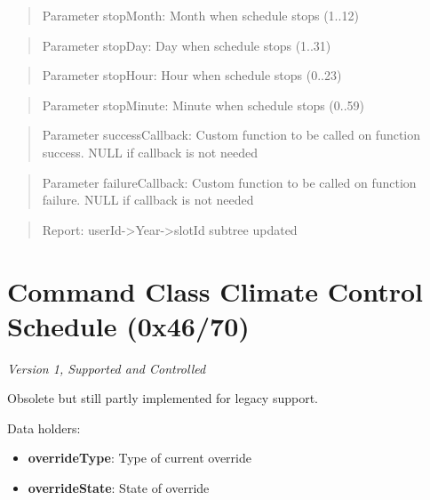 \begin{quote}Parameter stopMonth: Month when schedule stops (1..12)\end{quote}
\begin{quote}Parameter stopDay: Day when schedule stops (1..31)\end{quote}
\begin{quote}Parameter stopHour: Hour when schedule stops (0..23)\end{quote}
\begin{quote}Parameter stopMinute: Minute when schedule stops (0..59)\end{quote}
\begin{quote}Parameter successCallback: Custom function to be called on function success. NULL if callback is not needed\end{quote}
\begin{quote}Parameter failureCallback: Custom function to be called on function failure. NULL if callback is not needed\end{quote}
\begin{quote}Report: userId->Year->slotId subtree updated\end{quote}


\section{Command Class Climate Control Schedule (0x46/70)}

\textit{Version 1, Supported and Controlled}
\newline

Obsolete but still partly implemented for legacy support.
\newline

\noindent
Data holders:

\begin{itemize}
\item \textbf{overrideType}: Type of current override
\item \textbf{overrideState}: State of override
\end{itemize}

